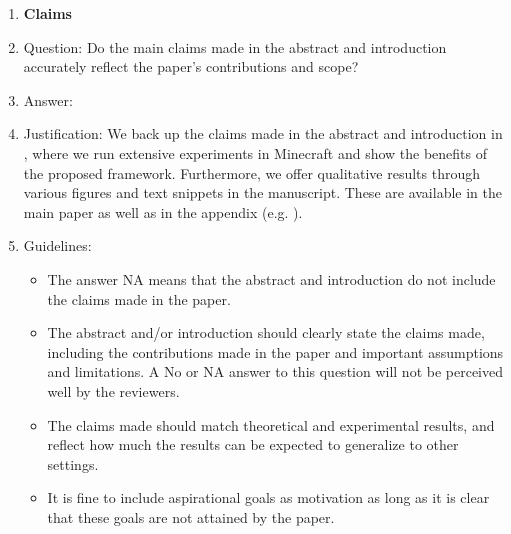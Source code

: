 \documentclass{article}
\begin{document}
\begin{enumerate}

\item {\bf Claims}
    \item[] Question: Do the main claims made in the abstract and introduction accurately reflect the paper's contributions and scope?
    \item[] Answer: \answerYes{} %
    \item[] Justification: We back up the claims made in the abstract and introduction in , where we run extensive experiments in Minecraft and show the benefits of the proposed framework. Furthermore, we offer qualitative results through various figures and text snippets in the manuscript. These are available in the main paper as well as in the appendix (e.g. ).
    \item[] Guidelines:
    \begin{itemize}
        \item The answer NA means that the abstract and introduction do not include the claims made in the paper.
        \item The abstract and/or introduction should clearly state the claims made, including the contributions made in the paper and important assumptions and limitations. A No or NA answer to this question will not be perceived well by the reviewers. 
        \item The claims made should match theoretical and experimental results, and reflect how much the results can be expected to generalize to other settings. 
        \item It is fine to include aspirational goals as motivation as long as it is clear that these goals are not attained by the paper. 
    \end{itemize}


\end{enumerate}
\end{document}

